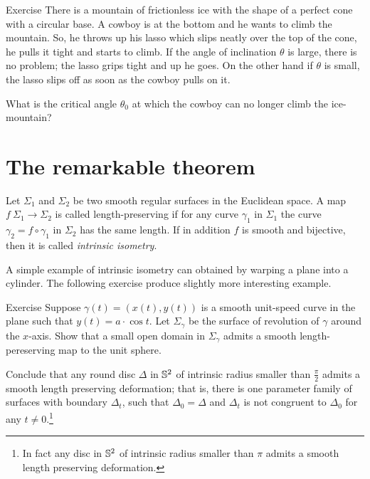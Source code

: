 \begin{thm}{Exercise}\label{ex:lasso}
There is a mountain of frictionless ice with the shape of a perfect cone with a circular base.
A cowboy is at the bottom and he wants to climb the mountain.
So, he throws up his lasso which slips neatly over the top of the cone, he pulls it tight and starts to climb.
If the angle of inclination $\theta$ is large, there is no problem; the lasso grips tight and up he goes.
On the other hand if $\theta$ is small, the lasso slips off as soon as the cowboy pulls on it.

What is the critical angle $\theta_0$ at which the cowboy can no longer climb the ice-mountain?
\end{thm}


\section*{The remarkable theorem}

Let $\Sigma_1$ and $\Sigma_2$ be two smooth regular surfaces in the Euclidean space.
A map $f\:\Sigma_1\to \Sigma_2$ is called  length-preserving if for any curve $\gamma_1$ in $\Sigma_1$ the curve $\gamma_2=f\circ\gamma_1$ in $\Sigma_2$ has the same length. %
If in addition $f$ is smooth and bijective, then it is called \emph{intrinsic isometry}. 

A simple example of intrinsic isometry can obtained by warping a plane into a cylinder.
The following exercise produce slightly more interesting example.

\begin{thm}{Exercise}\label{ex:deformation}
Suppose $\gamma(t)=(x(t),y(t))$ is a smooth unit-speed curve in the plane such that $y(t)=a\cdot \cos t$.
Let $\Sigma_\gamma$ be the surface of revolution of $\gamma$ around the $x$-axis.
Show that a small open domain in $\Sigma_\gamma$ admits a smooth length-pereserving map to the unit sphere.

Conclude that any round disc $\Delta$ in $\mathbb{S}^2$ of intrinsic radius smaller than $\tfrac\pi2$ admits a smooth length preserving deformation; that is, there is one parameter family of surfaces with boundary $\Delta_t$, such that $\Delta_0=\Delta$ and $\Delta_t$ is not congruent to $\Delta_0$ for any $t\ne0$.\footnote{In fact any disc in $\mathbb{S}^2$ of intrinsic radius smaller than $\pi$ admits a smooth length preserving deformation. %
}
\end{thm}



